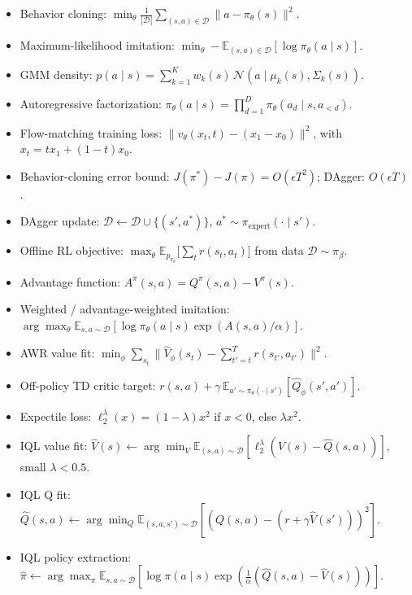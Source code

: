 \documentclass[11pt]{article}
\begin{document}
\begin{itemize}
\item Behavior cloning: $\min_\theta \frac{1}{|\mathcal D|}\sum_{(s,a)\in\mathcal D}\lVert a-\pi_\theta(s)\rVert^2$.
\item Maximum-likelihood imitation: $\min_\theta -\mathbb{E}_{(s,a)\in\mathcal D}[\log\pi_\theta(a\mid s)]$.
\item GMM density: $p(a\mid s) = \sum_{k=1}^K w_k(s)\,\mathcal N(a\mid \mu_k(s),\Sigma_k(s))$.
\item Autoregressive factorization: $\pi_\theta(a\mid s) = \prod_{d=1}^D \pi_\theta(a_d\mid s,a_{<d})$.
\item Flow-matching training loss: $\lVert v_\theta(x_t,t) - (x_1-x_0)\rVert^2$, with $x_t = tx_1+(1-t)x_0$.
\item Behavior-cloning error bound: $J(\pi^*) - J(\pi) = O(\epsilon T^2)$; DAgger: $O(\epsilon T)$.
\item DAgger update: $\mathcal D \leftarrow \mathcal D \cup \{(s',a^*)\}$, $a^*\sim\pi_{\text{expert}}(\cdot\mid s')$.
\item Offline RL objective: $\max_\theta \mathbb{E}_{p_{\pi_\theta}}\big[\sum_t r(s_t,a_t)\big]$ from data $\mathcal D \sim \pi_\beta$.
\item Advantage function: $A^\pi(s,a) = Q^\pi(s,a) - V^\pi(s)$.
\item Weighted / advantage-weighted imitation: $\arg\max_\theta \mathbb{E}_{s,a\sim\mathcal D}[\log\pi_\theta(a\mid s)\exp(A(s,a)/\alpha)]$.
\item AWR value fit: $\min_\phi \sum_{s_t}\lVert \hat V_\phi(s_t) - \sum_{t'=t}^T r(s_{t'},a_{t'})\rVert^2$.
\item Off-policy TD critic target: $r(s,a)+\gamma\,\mathbb{E}_{a'\sim\pi_\theta(\cdot\mid s')}[\hat Q_\phi(s',a')]$.
\item Expectile loss: $\ell_2^\lambda(x) = (1-\lambda)x^2$ if $x<0$, else $\lambda x^2$.
\item IQL value fit: $\hat V(s)\leftarrow \arg\min_V \mathbb E_{(s,a)\sim\mathcal D}[\ell_2^\lambda(V(s)-\hat Q(s,a))]$, small $\lambda<0.5$.
\item IQL Q fit: $\hat Q(s,a)\leftarrow \arg\min_Q \mathbb E_{(s,a,s')\sim\mathcal D}[(Q(s,a)-(r+\gamma\hat V(s')))^2]$.
\item IQL policy extraction: $\hat\pi \leftarrow \arg\max_\pi \mathbb E_{s,a\sim\mathcal D}[\log\pi(a\mid s)\exp(\frac{1}{\alpha}(\hat Q(s,a)-\hat V(s)))]$.
\end{itemize}
\end{document}
